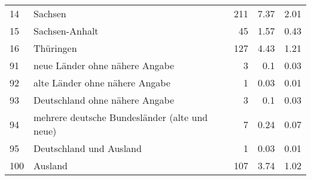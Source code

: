 \begin{longtable}{lXrrr}
        14 & \multicolumn{1}{X}{Sachsen} & %
          \num{211} &
          \num[round-mode=places,round-precision=2]{7,37} &
          \num[round-mode=places,round-precision=2]{2,01} \\

        15 & \multicolumn{1}{X}{Sachsen-Anhalt} & %
          \num{45} &
          \num[round-mode=places,round-precision=2]{1,57} &
          \num[round-mode=places,round-precision=2]{0,43} \\

        16 & \multicolumn{1}{X}{Thüringen} & %
          \num{127} &
          \num[round-mode=places,round-precision=2]{4,43} &
          \num[round-mode=places,round-precision=2]{1,21} \\

        91 & \multicolumn{1}{X}{neue Länder ohne nähere Angabe} & %
          \num{3} &
          \num[round-mode=places,round-precision=2]{0,1} &
          \num[round-mode=places,round-precision=2]{0,03} \\

        92 & \multicolumn{1}{X}{alte Länder ohne nähere Angabe} & %
          \num{1} &
          \num[round-mode=places,round-precision=2]{0,03} &
          \num[round-mode=places,round-precision=2]{0,01} \\

        93 & \multicolumn{1}{X}{Deutschland ohne nähere Angabe} & %
          \num{3} &
          \num[round-mode=places,round-precision=2]{0,1} &
          \num[round-mode=places,round-precision=2]{0,03} \\

        94 & \multicolumn{1}{X}{mehrere deutsche Bundesländer (alte und neue)} & %
          \num{7} &
          \num[round-mode=places,round-precision=2]{0,24} &
          \num[round-mode=places,round-precision=2]{0,07} \\

        95 & \multicolumn{1}{X}{Deutschland und Ausland} & %
          \num{1} &
          \num[round-mode=places,round-precision=2]{0,03} &
          \num[round-mode=places,round-precision=2]{0,01} \\

        100 & \multicolumn{1}{X}{Ausland} & %
          \num{107} &
          \num[round-mode=places,round-precision=2]{3,74} &
          \num[round-mode=places,round-precision=2]{1,02} \\


\end{longtable}
